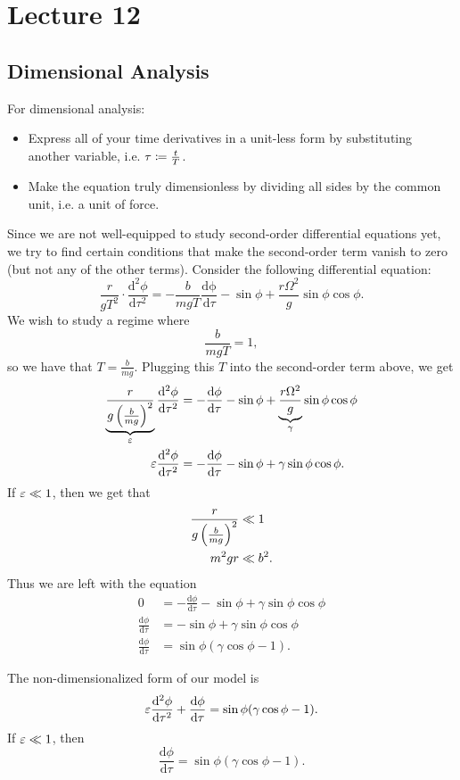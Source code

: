 \documentclass[class=article, crop=false]{standalone}
\begin{document}
  \section{Lecture 12}
  \subsection{Dimensional Analysis}
  \begin{note}{}
    For dimensional analysis:
    \begin{itemize}
      \item Express all of your time derivatives in a unit-less form by substituting another variable, i.e. $\tau\coloneqq \frac{t}{T}$.
      \item Make the equation truly dimensionless by dividing all sides by the common unit, i.e. a unit of force.
    \end{itemize}
  \end{note}
  Since we are not well-equipped to study second-order differential equations yet, we try to find certain conditions that make the second-order term vanish to zero (but not any of the other terms). Consider the following differential equation:
  \[
    \frac{r}{gT^2}\cdot \frac{\mathrm{d}^2\phi}{\mathrm{d}\tau^2} = -\frac{b}{mgT} \frac{\mathrm{d\phi}}{\mathrm{d}\tau} - \sin\phi + \frac{r\Omega^2}{g}\sin\phi\cos\phi.
  \]
  We wish to study a regime where
  \[
    \frac{b}{mgT} = 1,
  \]
  so we have that $T = \frac{b}{mg}$. Plugging this $T$ into the second-order term above, we get
  \begin{align*}
    \underbrace{\frac{r}{g\left( \frac{b}{mg} \right)^2}}_{\varepsilon} \frac{\mathrm{d}^2\phi}{\mathrm{d}\tau^2} &= -\frac{\mathrm{d}\phi}{\mathrm{d}\tau} - \sin\phi + \underbrace{\frac{r\Omega^2}{g}}_{\gamma}\sin\phi\cos\phi \\
    \varepsilon \frac{\mathrm{d}^2\phi}{\mathrm{d}\tau^2} &= -\frac{\mathrm{d}\phi}{\mathrm{d}\tau} - \sin\phi + \gamma\sin\phi\cos\phi.
  \end{align*}
  If $\varepsilon \ll 1$, then we get that
  \begin{align*}
    \frac{r}{g\left( \frac{b}{mg} \right)^2} &\ll 1 \\
    m^2gr &\ll b^2.
  \end{align*}
  Thus we are left with the equation
  \begin{align*}
    0 &= -\frac{\mathrm{d}\phi}{\mathrm{d}\tau} - \sin\phi + \gamma\sin\phi\cos\phi \\
    \frac{\mathrm{d}\phi}{\mathrm{d}\tau} &= - \sin\phi + \gamma\sin\phi\cos\phi \\
    \frac{\mathrm{d}\phi}{\mathrm{d}\tau} &= \sin\phi(\gamma\cos\phi - 1).
  \end{align*}
  \begin{note}{}
    The non-dimensionalized form of our model is
    \[
      \varepsilon \frac{\mathrm{d}^2\phi}{\mathrm{d}\tau^2} + \frac{\mathrm{d}\phi}{\mathrm{d}\tau} = \sin\phi(\gamma\cos\phi - 1).
    \]
    If $\varepsilon \ll 1$, then
    \[
      \frac{\mathrm{d}\phi}{\mathrm{d}\tau} = \sin\phi(\gamma\cos\phi - 1).
    \]
  \end{note}
\end{document}
